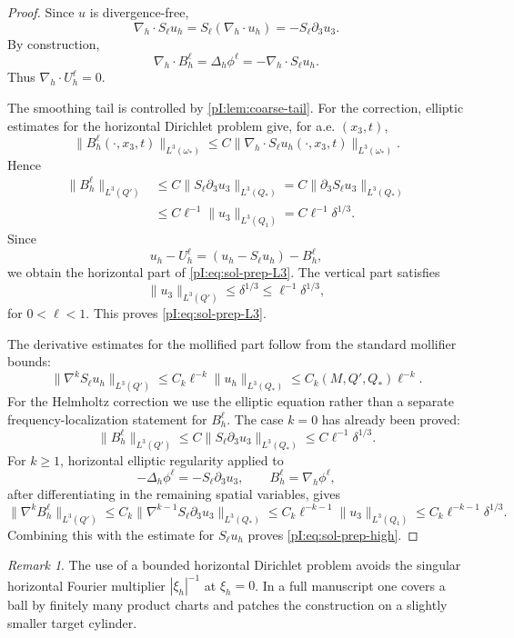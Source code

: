 \documentclass[11pt]{article}
\numberwithin{equation}{section}
\theoremstyle{plain}
\theoremstyle{definition}
\theoremstyle{remark}
\newtheorem{remark}{Remark}[section]
\newcommand{\divh}{\nabla_h\!\cdot}
\begin{document}
\begin{proof}
Since \(u\) is divergence-free,
\[
        \divh S_\ell u_h
        =S_\ell(\divh u_h)
        =-S_\ell\partial_3u_3.
\]
By construction,
\[
        \divh B_h^\ell=\Delta_h\phi^\ell=-\divh S_\ell u_h.
\]
Thus \(\divh U_h^\ell=0\).

The smoothing tail is controlled by \cref{pI:lem:coarse-tail}.  For the correction, elliptic estimates for the horizontal Dirichlet problem give, for a.e. \((x_3,t)\),
\[
        \|B_h^\ell(\cdot,x_3,t)\|_{L^3(\omega_*)}
        \le C\|\divh S_\ell u_h(\cdot,x_3,t)\|_{L^3(\omega_*)}.
\]
Hence
\[
\begin{aligned}
        \|B_h^\ell\|_{L^3(Q')}
        &\le C\|S_\ell\partial_3u_3\|_{L^3(Q_*)}
        =C\|\partial_3S_\ell u_3\|_{L^3(Q_*)}\\
        &\le C\ell^{-1}\|u_3\|_{L^3(Q_1)}
        =C\ell^{-1}\delta^{1/3}.
\end{aligned}
\]
Since
\[
        u_h-U_h^\ell=(u_h-S_\ell u_h)-B_h^\ell,
\]
we obtain the horizontal part of \eqref{pI:eq:sol-prep-L3}.  The vertical part satisfies
\[
        \|u_3\|_{L^3(Q')}\le\delta^{1/3}\le\ell^{-1}\delta^{1/3},
\]
for \(0<\ell<1\).  This proves \eqref{pI:eq:sol-prep-L3}.

The derivative estimates for the mollified part follow from the standard mollifier bounds:
\[
        \|\nabla^k S_\ell u_h\|_{L^3(Q')}
        \le C_k\ell^{-k}\|u_h\|_{L^3(Q_*)}
        \le C_k(M,Q',Q_*)\ell^{-k}.
\]
For the Helmholtz correction we use the elliptic equation rather than a separate frequency-localization statement for \(B_h^\ell\).  The case \(k=0\) has already been proved:
\[
        \|B_h^\ell\|_{L^3(Q')}
        \le C\|S_\ell\partial_3u_3\|_{L^3(Q_*)}
        \le C\ell^{-1}\delta^{1/3}.
\]
For \(k\ge1\), horizontal elliptic regularity applied to
\[
        -\Delta_h\phi^\ell=-S_\ell\partial_3u_3,
        \qquad B_h^\ell=\nabla_h\phi^\ell,
\]
after differentiating in the remaining spatial variables, gives
\[
        \|\nabla^kB_h^\ell\|_{L^3(Q')}
        \le C_k\|\nabla^{k-1}S_\ell\partial_3u_3\|_{L^3(Q_*)}
        \le C_k\ell^{-k-1}\|u_3\|_{L^3(Q_1)}
        \le C_k\ell^{-k-1}\delta^{1/3}.
\]
Combining this with the estimate for \(S_\ell u_h\) proves \eqref{pI:eq:sol-prep-high}.
\end{proof}

\begin{remark}
The use of a bounded horizontal Dirichlet problem avoids the singular horizontal Fourier multiplier \(|\xi_h|^{-1}\) at \(\xi_h=0\).  In a full manuscript one covers a ball by finitely many product charts and patches the construction on a slightly smaller target cylinder.
\end{remark}
\end{document}
